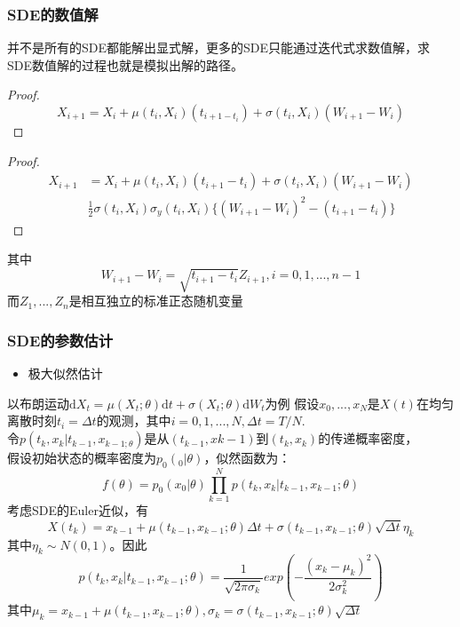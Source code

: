 \documentclass{beamer}
\renewcommand{\proofname}{标准布朗运动的数学性质}
\begin{document}
\begin{frame}

\frametitle{SDE的数值解}
\footnotesize

并不是所有的SDE都能解出显式解，更多的SDE只能通过迭代式求数值解，求SDE数值解的过程也就是模拟出解的路径。
\renewcommand{\proofname}{Euler格式}
\begin{proof}
$$X_{i+1} = X_i + \mu (t_i,X_i)(t_{i+1-t_i}) + \sigma(t_i,X_i)(W_{i+1}-W_i)$$
\end{proof}

\renewcommand{\proofname}{Milstein格式}
\begin{proof}
\begin{align}
X_{i+1} &= X_i + \mu (t_i,X_i)(t_{i+1}-t_i)+\sigma (t_i,X_i)(W_{i+1}-W_i)\\
&\frac{1}{2}\sigma(t_i,X_i)\sigma_y(t_i,X_i)\{(W_{i+1}-W_i)^2-(t_{i+1}-t_i)\}
\end{align}

\end{proof}

其中$$W_{i+1}-W_i = \sqrt{t_{i+1}-t_i}Z_{i+1}, i=0,1,...,n-1$$
而$Z_1,...,Z_n$是相互独立的标准正态随机变量

\end{frame}

\begin{frame}

\frametitle{SDE的参数估计}
\begin{itemize}
\item 极大似然估计
\end{itemize}
以布朗运动$\mathrm{d}X_t = \mu(X_t;\theta)\mathrm{d}t + \sigma(X_t;\theta)\mathrm{d}W_t$为例
假设$x_0,...,x_N$是$X(t)$在均匀离散时刻$t_i = \Delta t$的观测，其中$i = 0,1,...,N, \Delta t = T/N.$\\
令$p(t_k,x_k|t_{k-1},x_{k-1;\theta})$是从$(t_{k-1},x{k-1})$到$(t_k,x_k)$的传递概率密度，\\
假设初始状态的概率密度为$p_0(_0|\theta)$，似然函数为：$$f(\theta) = p_0(x_0|\theta)\prod_{k=1}^Np(t_k,x_k|t_{k-1},x_{k-1};\theta)$$
考虑SDE的Euler近似，有$$X(t_k) = x_{k-1} + \mu (t_{k-1},x_{k-1};\theta)\Delta t + \sigma(t_{k-1},x_{k-1};\theta)\sqrt{\Delta t}\eta_k$$
其中$\eta_k \sim N(0,1)$。因此
$$p(t_k,x_k|t_{k-1},x_{k-1};\theta) = \frac{1}{\sqrt{2\pi\sigma_k}}exp(-\frac{(x_k-\mu_k)^2}{2\sigma_k^2})$$
其中$\mu_k = x_{k-1} + \mu(t_{k-1},x_{k-1};\theta), \sigma_k = \sigma(t_{k-1},x_{k-1};\theta)\sqrt{\Delta t}$

\end{frame}
\end{document}
